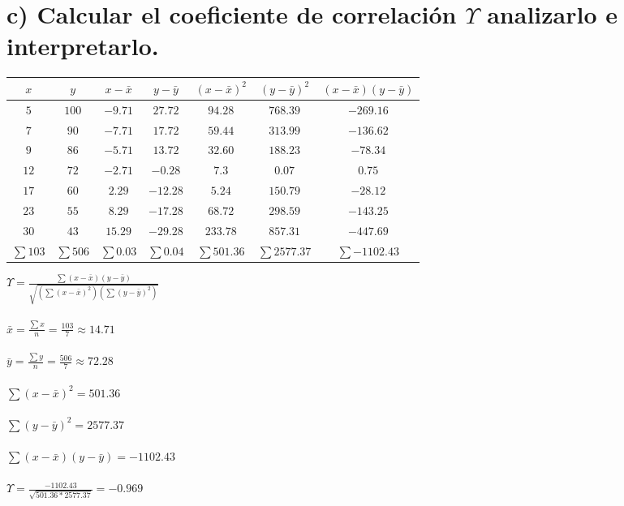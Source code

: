 \documentclass[12pt]{article}
\begin{document}
	\section*{c) Calcular el coeficiente de correlación $\Upsilon$  analizarlo e interpretarlo.}
	\begin{table}[h]
		\centering
		\begin{tabular}{|c|c|c|c|c|c|c|}
			\hline
			$x$ & $y$ & $x-\bar{x}$ & $y-\bar{y}$ & $(x-\bar{x})^2$ & $(y-\bar{y})^2$ & $(x-\bar{x})(y-\bar{y})$ \\ \hline
			$5$ & $100$ & $-9.71$ & $27.72$ & $94.28$ & $768.39$ & $-269.16$ \\ \hline
			$7$ & $90$ & $-7.71$ & $17.72$ & $59.44$ & $313.99$ & $-136.62$ \\ \hline
			$9$ & $86$ & $-5.71$ & $13.72$ & $32.60$ & $188.23$ & $-78.34$ \\ \hline
			$12$ & $72$ & $-2.71$ & $-0.28$ & $7.3$ & $0.07$ & $0.75$ \\ \hline
			$17$ & $60$ & $2.29$ & $-12.28$ & $5.24$ & $150.79$ & $-28.12$ \\ \hline
			$23$ & $55$ & $8.29$ & $-17.28$ & $68.72$ & $298.59$ & $-143.25$ \\ \hline
			$30$ & $43$ & $15.29$ & $-29.28$ & $233.78$ & $857.31$ & $-447.69$ \\ \hline
			$\sum{103}$ & $\sum{506}$ & $\sum{0.03}$ & $\sum{0.04}$ & $\sum{501.36}$ & $\sum{2577.37}$ & $\sum{-1102.43}$ \\ \hline
		\end{tabular}
	\end{table}
	
	\LARGE{$\Upsilon=\frac{\sum{(x-\bar{x})(y-\bar{y})}}{\sqrt{(\sum{(x-\bar{x})^2})(\sum{(y-\bar{y})^2})}}$} \\ \\
	$\bar{x}=\frac{\sum{x}}{n}=\frac{103}{7}\approx14.71$ \\ \\
	$\bar{y}=\frac{\sum{y}}{n}=\frac{506}{7}\approx72.28$ \\ \\
	\large{$\sum{(x-\bar{x})^2} = 501.36$} \\ \\
	$\sum{(y-\bar{y})^2} = 2577.37$ \\ \\
	$\sum{(x-\bar{x})(y-\bar{y})} = -1102.43$ \\ \\
	\large{$\Upsilon = \frac{-1102.43}{\sqrt{501.36*2577.37}} = -0.969$} \\
	
\end{document}
